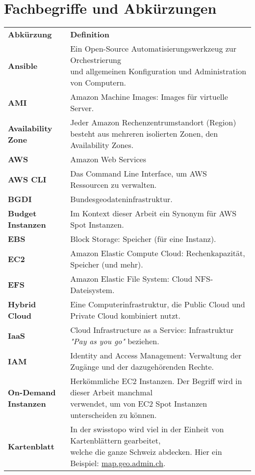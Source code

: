 \section{Fachbegriffe und Abkürzungen}
\begin{table}[!htbp]
\begin{tabular}{p{}p{}}
    \textbf{Abkürzung} & \textbf{Definition}\\
    \textbf{Ansible} & \makecell[l]{Ein Open-Source Automatisierungswerkzeug zur Orchestrierung\\ und allgemeinen Konfiguration und Administration von Computern.}\\
    \textbf{AMI} & Amazon Machine Images: Images für virtuelle Server.\\
    \textbf{Availability Zone} & \makecell[l]{Jeder Amazon Rechenzentrumstandort (Region)\\
    besteht aus mehreren isolierten Zonen, den Availability Zones.}\\
    \textbf{AWS} & Amazon Web Services\\
    \textbf{AWS CLI} & Das Command Line Interface, um AWS Ressourcen zu verwalten.\\
    \textbf{BGDI} & Bundesgeodateninfrastruktur.\\
    \textbf{Budget Instanzen} & Im Kontext dieser Arbeit ein Synonym für AWS Spot Instanzen.\\
    \textbf{EBS} & Block Storage: Speicher (für eine Instanz).\\
    \textbf{EC2} & Amazon Elastic Compute Cloud: Rechenkapazität, Speicher (und mehr).\\
    \textbf{EFS} & Amazon Elastic File System: Cloud NFS-Dateisystem.\\
    \textbf{Hybrid Cloud} & Eine Computerinfrastruktur, die Public Cloud und Private Cloud kombiniert nutzt.\\
    \textbf{IaaS} & Cloud Infrastructure as a Service: Infrastruktur \emph{"Pay as you go"} beziehen.\\
    \textbf{IAM} & Identity and Access Management: Verwaltung der Zugänge und der dazugehörenden Rechte.\\
    \makecell[l]{\textbf{On-Demand}\\ \textbf{Instanzen}} & \makecell[l]{Herkömmliche EC2 Instanzen. Der Begriff wird in dieser Arbeit manchmal\\ verwendet, um von EC2 Spot Instanzen unterscheiden zu können.}\\
    \textbf{Kartenblatt} & \makecell[l]{In der swisstopo wird viel in der Einheit von Kartenblättern gearbeitet,\\ welche die ganze Schweiz abdecken. Hier ein Beispiel: \href{https://s.geo.admin.ch/8b5f3f6721}{map.geo.admin.ch}.}\\

\end{tabular}
\end{table}
